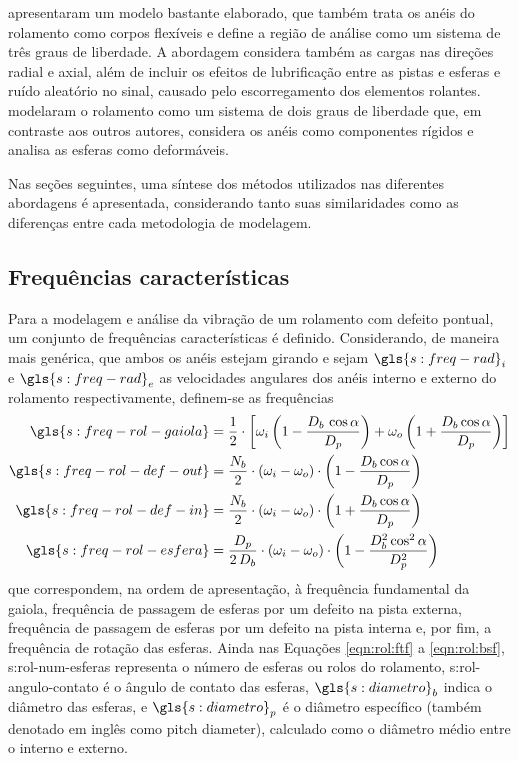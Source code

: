 \documentclass[12pt,openright,oneside,a4paper,
	chapter=TITLE,section=TITLE,
	english,brazil]{abntex2}
\begin{document}
	\citeauthor{sassi:2007} apresentaram um modelo bastante elaborado, que também trata os anéis do rolamento como corpos flexíveis e define a região de análise como um sistema de três graus de liberdade. A abordagem considera também as cargas nas direções radial e axial, além de incluir os efeitos de lubrificação entre as pistas e esferas e ruído aleatório no sinal, causado pelo escorregamento dos elementos rolantes.	\citeauthor{patil:2010} modelaram o rolamento como um sistema de dois graus de liberdade que, em contraste aos outros autores, considera os anéis como componentes rígidos e analisa as esferas como deformáveis.
	
	Nas seções seguintes, uma síntese dos métodos utilizados nas diferentes abordagens é apresentada, considerando tanto suas similaridades como as diferenças entre cada metodologia de modelagem.
	
	\subsection{Frequências características}
	Para a modelagem e análise da vibração de um rolamento com defeito pontual, um conjunto de frequências características é definido. Considerando, de maneira mais genérica, que ambos os anéis estejam girando e sejam $ \gls{s:freq-rad}_i $ e $ \gls{s:freq-rad}_e $ as velocidades angulares dos anéis interno e externo do rolamento respectivamente, definem-se as frequências \cite{sassi:2007}
	\begin{align}
		\gls{s:freq-rol-gaiola} &= \frac{1}{2}\cdot\left[ \omega_i\left(1-\frac{D_b\,\cos\alpha}{D_p} \right) + \omega_o\left(1+\frac{D_b\cos\alpha}{D_p} \right) \right] \label{eqn:rol:ftf}\\
		\gls{s:freq-rol-def-out} &= \frac{N_b}{2}\cdot(\omega_i-\omega_o)\cdot\left(1-\frac{D_b\cos\alpha}{D_p} \right) \label{eqn:rol:bpfo}\\
		\gls{s:freq-rol-def-in} &= \frac{N_b}{2}\cdot(\omega_i-\omega_o)\cdot\left(1+\frac{D_b\cos\alpha}{D_p} \right) \label{eqn:rol:bpfi}\\
		\gls{s:freq-rol-esfera} &= \frac{D_p}{2\,D_b}\cdot(\omega_i-\omega_o)\cdot\left(1-\frac{D_b^2\cos^2\alpha}{D_p^2} \right) \label{eqn:rol:bsf}
	\end{align}
	que correspondem, na ordem de apresentação, à frequência fundamental da gaiola, frequência de passagem de esferas por um defeito na pista externa, frequência de passagem de esferas por um defeito na pista interna e, por fim, a frequência de rotação das esferas. Ainda nas Equações \ref{eqn:rol:ftf} a \ref{eqn:rol:bsf}, \gls{s:rol-num-esferas} representa o número de esferas ou rolos do rolamento, \gls{s:rol-angulo-contato} é o ângulo de contato das esferas, $ \gls{s:diametro}_b $ indica o diâmetro das esferas, e $ \gls{s:diametro}_p $ é o diâmetro específico (também denotado em inglês como \foreignlanguage{english}{pitch diameter}), calculado como o diâmetro médio entre o interno e externo.
	
\end{document}
